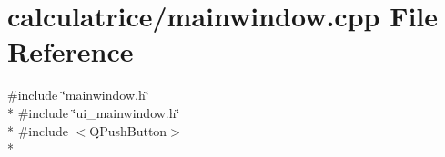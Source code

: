 \section{calculatrice/mainwindow.cpp File Reference}
\label{mainwindow_8cpp}
{\ttfamily \#include \char`\"{}mainwindow.\-h\char`\"{}}\\*
{\ttfamily \#include \char`\"{}ui\-\_\-mainwindow.\-h\char`\"{}}\\*
{\ttfamily \#include $<$Q\-Push\-Button$>$}\\*
